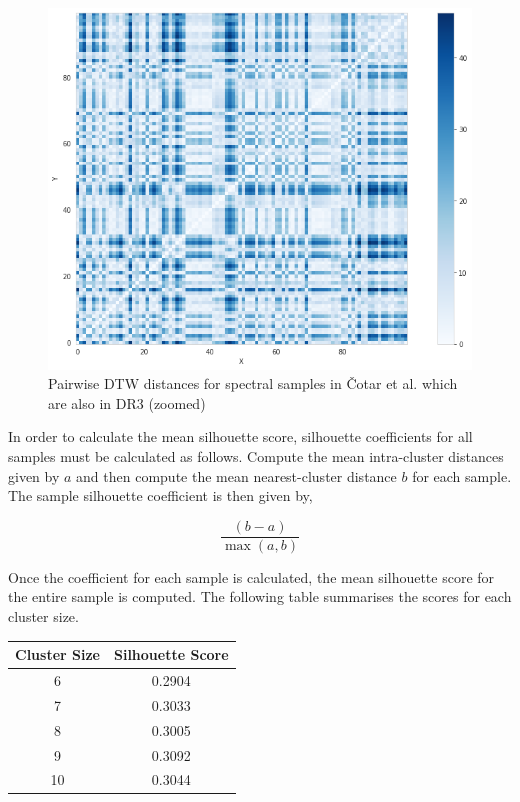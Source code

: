 \begin{figure}[t]
\centering
\includegraphics[scale=0.60]{figures/dtw cotar zoomed.png}
\caption{Pairwise DTW distances for spectral samples in Čotar et al. which are also in DR3 (zoomed)}
\end{figure}

In order to calculate the mean silhouette score, silhouette coefficients for all samples must be calculated as follows. Compute the mean intra-cluster distances given by $a$ and then compute the mean nearest-cluster distance $b$ for each sample. The sample silhouette coefficient is then given by,

\begin{equation}
\frac{(b-a)}{\max_{}(a,b)}
\end{equation}

Once the coefficient for each sample is calculated, the mean silhouette score for the entire sample is computed. The following table summarises the scores for each cluster size.


\begin{center}
\begin{tabular}{||c c||} 
 \hline
 Cluster Size & Silhouette Score \\ [0.5ex]
 \hline\hline
 6 & 0.2904 \\ 
 \hline\hline
 7 & 0.3033 \\ 
 \hline
 8 & 0.3005 \\
 \hline
 9 & 0.3092 \\
 \hline
 10 & 0.3044 \\ [1ex] 
 \hline
\end{tabular}
\end{center}

